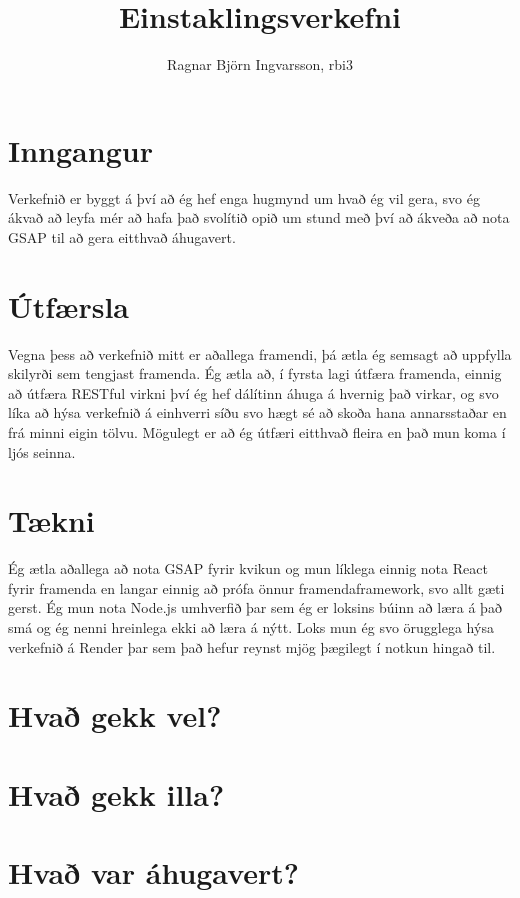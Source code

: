 \documentclass{article}
\title{Einstaklingsverkefni}
\author{Ragnar Björn Ingvarsson, rbi3}
\begin{document}
\renewcommand\thepage{}

	\maketitle

	\newpage
	\setcounter{page}{1}
	\renewcommand\thepage{\arabic{page}}

	\section{Inngangur}
	Verkefnið er byggt á því að ég hef enga hugmynd um hvað ég vil gera, svo 
	ég ákvað að leyfa mér að hafa það svolítið opið um stund með því að ákveða 
	að nota GSAP til að gera eitthvað áhugavert.

	\section{Útfærsla}
	Vegna þess að verkefnið mitt er aðallega framendi, þá ætla ég semsagt að 
	uppfylla skilyrði sem tengjast framenda. Ég ætla að, í fyrsta lagi útfæra 
	framenda, einnig að útfæra RESTful virkni því ég hef dálítinn áhuga á 
	hvernig það virkar, og svo líka að hýsa verkefnið á einhverri síðu svo 
	hægt sé að skoða hana annarsstaðar en frá minni eigin tölvu. Mögulegt er 
	að ég útfæri eitthvað fleira en það mun koma í ljós seinna.

	\section{Tækni}

	Ég ætla aðallega að nota GSAP fyrir kvikun og mun líklega einnig nota 
	React fyrir framenda en langar einnig að prófa önnur framendaframework, 
	svo allt gæti gerst. Ég mun nota Node.js umhverfið þar sem ég er loksins 
	búinn að læra á það smá og ég nenni hreinlega ekki að læra á nýtt. Loks 
	mun ég svo örugglega hýsa verkefnið á Render þar sem það hefur reynst 
	mjög þægilegt í notkun hingað til.

	\section{Hvað gekk vel?}
	\section{Hvað gekk illa?}
	\section{Hvað var áhugavert?}
	
\end{document}
